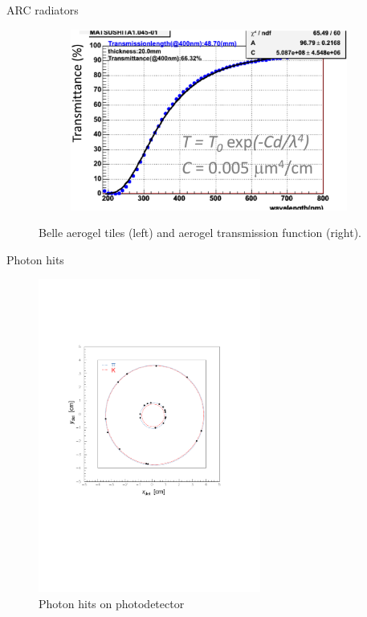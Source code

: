 \documentclass{beamer}
\begin{document}
\begin{frame}{ARC radiators}
\begin{figure}
\begin{subfigure}{0.25\textwidth}
    \end{subfigure}%
    \hspace{0.2cm}
    \begin{subfigure}{0.25\textwidth}
      \includegraphics[width = 1.0\textwidth]{Plots/AerogelTransmission.png}
    \end{subfigure}
    \caption{Belle aerogel tiles (left) and aerogel transmission function (right).}
  \end{figure}
\end{frame}

\begin{frame}{Photon hits}
  \begin{figure}
    \centering
    \includegraphics[width = 0.65\textwidth, trim = {2cm 9cm 3cm 6cm}, clip = true]{Plots/Display1.pdf}
    \caption{Photon hits on photodetector}
  \end{figure}
\end{frame}
\end{document}
